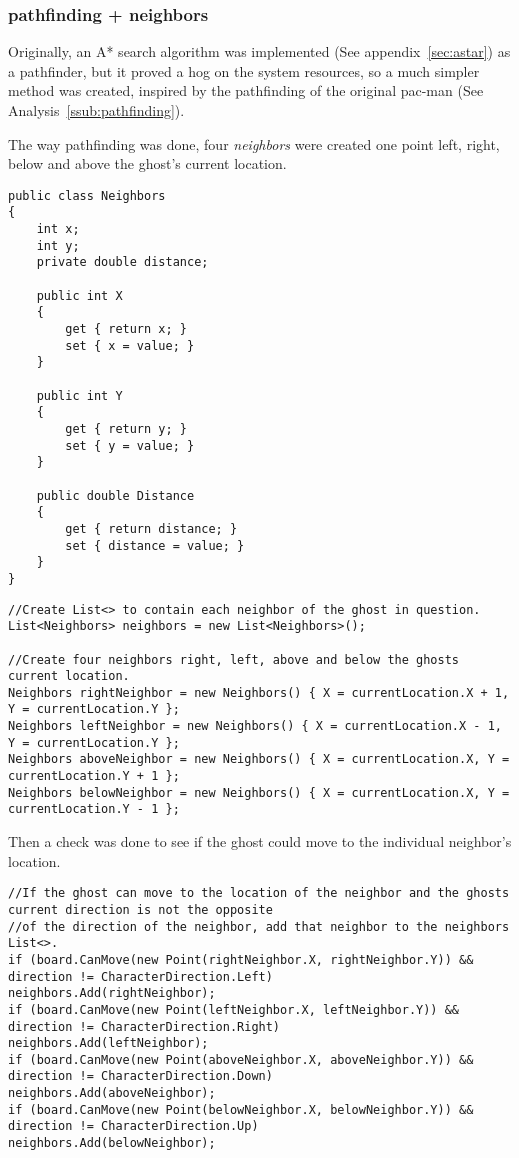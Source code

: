 \subsubsection*{pathfinding + neighbors}
Originally, an A* search algorithm was implemented (See appendix~\ref{sec:astar}) as a pathfinder, but it proved a hog on the system resources, so a much simpler method was created, inspired by the pathfinding of the original pac-man (See Analysis~\ref{ssub:pathfinding}).

The way pathfinding was done, four \emph{neighbors} were created one point left, right, below and above the ghost’s current location.

\begin{lstlisting}[caption=Neighbor class, label=lst:neighbor]
public class Neighbors
{
	int x;
	int y;
	private double distance;

	public int X
	{
		get { return x; }
		set { x = value; }
	}

	public int Y
	{
		get { return y; }
		set { y = value; }
	}

	public double Distance
	{
		get { return distance; }
		set { distance = value; }
	}
}
\end{lstlisting}

\begin{lstlisting}[caption=Instantiate neighbors, label=lst:instantiateneighbors]
//Create List<> to contain each neighbor of the ghost in question.
List<Neighbors> neighbors = new List<Neighbors>();

//Create four neighbors right, left, above and below the ghosts current location.
Neighbors rightNeighbor = new Neighbors() { X = currentLocation.X + 1, Y = currentLocation.Y };
Neighbors leftNeighbor = new Neighbors() { X = currentLocation.X - 1, Y = currentLocation.Y };
Neighbors aboveNeighbor = new Neighbors() { X = currentLocation.X, Y = currentLocation.Y + 1 };
Neighbors belowNeighbor = new Neighbors() { X = currentLocation.X, Y = currentLocation.Y - 1 };
\end{lstlisting}

Then a check was done to see if the ghost could move to the individual neighbor’s location.

\begin{lstlisting}[caption=canMove check, label=lst:canMove]
//If the ghost can move to the location of the neighbor and the ghosts current direction is not the opposite
//of the direction of the neighbor, add that neighbor to the neighbors List<>.
if (board.CanMove(new Point(rightNeighbor.X, rightNeighbor.Y)) && direction != CharacterDirection.Left)
neighbors.Add(rightNeighbor);
if (board.CanMove(new Point(leftNeighbor.X, leftNeighbor.Y)) && direction != CharacterDirection.Right)
neighbors.Add(leftNeighbor);
if (board.CanMove(new Point(aboveNeighbor.X, aboveNeighbor.Y)) && direction != CharacterDirection.Down)
neighbors.Add(aboveNeighbor);
if (board.CanMove(new Point(belowNeighbor.X, belowNeighbor.Y)) && direction != CharacterDirection.Up)
neighbors.Add(belowNeighbor);
\end{lstlisting}

